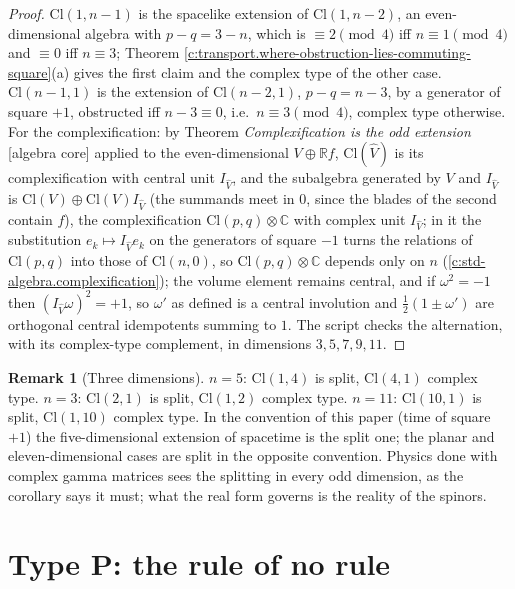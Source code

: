 \documentclass[11pt]{article}
\theoremstyle{definition}
\newtheorem{remark}[theorem]{Remark}
\theoremstyle{plain}
\providecommand{\C}{}\renewcommand{\C}{\mathbb{C}}
\providecommand{\Cl}{}\renewcommand{\Cl}{\mathrm{Cl}}
\providecommand{\R}{}\renewcommand{\R}{\mathbb{R}}
\begin{document}
\begin{proof}
$\Cl(1,n{-}1)$ is the spacelike extension of $\Cl(1,n{-}2)$, an even-dimensional algebra with $p - q = 3 - n$, which is $\equiv 2 \pmod 4$ iff $n \equiv 1 \pmod 4$ and $\equiv 0$ iff $n \equiv 3$; Theorem \ref{c:transport.where-obstruction-lies-commuting-square}(a) gives the first claim and the complex type of the other case. $\Cl(n{-}1,1)$ is the extension of $\Cl(n{-}2,1)$, $p - q = n - 3$, by a generator of square $+1$, obstructed iff $n - 3 \equiv 0$, i.e.\ $n \equiv 3 \pmod 4$, complex type otherwise. For the complexification: by Theorem \emph{Complexification is the odd extension} [algebra core] applied to the even-dimensional $V \oplus \R f$, $\Cl(\hat V)$ is its complexification with central unit $I_{\hat V}$, and the subalgebra generated by $V$ and $I_{\hat V}$ is $\Cl(V) \oplus \Cl(V)I_{\hat V}$ (the summands meet in $0$, since the blades of the second contain $f$), the complexification $\Cl(p,q) \otimes \C$ with complex unit $I_{\hat V}$; in it the substitution $e_k \mapsto I_{\hat V}e_k$ on the generators of square $-1$ turns the relations of $\Cl(p,q)$ into those of $\Cl(n,0)$, so $\Cl(p,q) \otimes \C$ depends only on $n$ (\ref{c:std-algebra.complexification}); the volume element remains central, and if $\omega^2 = -1$ then $(I_{\hat V}\omega)^2 = +1$, so $\omega'$ as defined is a central involution and $\tfrac12(1 \pm \omega')$ are orthogonal central idempotents summing to $1$. The script checks the alternation, with its complex-type complement, in dimensions $3, 5, 7, 9, 11$.

\end{proof}

\begin{remark}[Three dimensions]\label{c:note.transport.three-dimensions}
$n = 5$: $\Cl(1,4)$ is split, $\Cl(4,1)$ complex type. $n = 3$: $\Cl(2,1)$ is split, $\Cl(1,2)$ complex type. $n = 11$: $\Cl(10,1)$ is split, $\Cl(1,10)$ complex type. In the convention of this paper (time of square $+1$) the five-dimensional extension of spacetime is the split one; the planar and eleven-dimensional cases are split in the opposite convention. Physics done with complex gamma matrices sees the splitting in every odd dimension, as the corollary says it must; what the real form governs is the reality of the spinors.
\end{remark}

\section{Type P: the rule of no rule}
\end{document}
